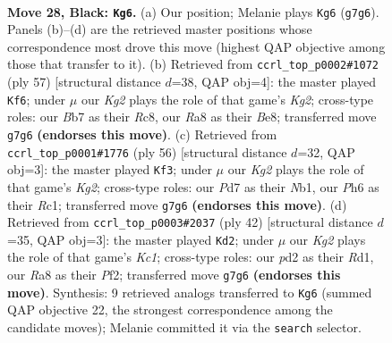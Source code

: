 \documentclass[11pt]{article}
\begin{document}
\clearpage

\begin{figure}[p]\centering
\begin{subfigure}{0.46\textwidth}\centering
\resizebox{\linewidth}{!}{%
\newchessgame
\chessboard[
  setfen={r7/pbpp2k1/1p3n1p/5p2/2P2P2/NP2K3/P2PB2P/R7 b - - 2 28},
  showmover=false,
  pgfstyle=straightmove, color=movearrow, markmove={g7-g6}
]}
\caption{}
\end{subfigure}\hfill
\begin{subfigure}{0.46\textwidth}\centering
\resizebox{\linewidth}{!}{%
\newchessgame
\chessboard[
  setfen={2r1b3/1p3pkp/p3p3/6p1/2P1P3/1P1R3P/P4PP1/5BK1 b - - 0 29},
  showmover=false,
  pgfstyle=straightmove, color=movearrow, markmove={g7-f6}
]}
\caption{}
\end{subfigure}
\\[4pt]
\begin{subfigure}{0.46\textwidth}\centering
\resizebox{\linewidth}{!}{%
\newchessgame
\chessboard[
  setfen={r7/1p3pk1/n3pbpp/3p4/3P4/BP2P1PP/5PK1/1NR5 w - - 2 29},
  showmover=false,
  pgfstyle=straightmove, color=movearrow, markmove={g2-f3}
]}
\caption{}
\end{subfigure}\hfill
\begin{subfigure}{0.46\textwidth}\centering
\resizebox{\linewidth}{!}{%
\newchessgame
\chessboard[
  setfen={r7/1p2kp2/2pb1p1p/4pP2/p7/2PB4/PP3PPP/2KR4 w - - 0 22},
  showmover=false,
  pgfstyle=straightmove, color=movearrow, markmove={c1-d2}
]}
\caption{}
\end{subfigure}
\caption{\textbf{Move 28, Black: \texttt{Kg6}.} (a) Our position; Melanie plays \texttt{Kg6} (\texttt{g7g6}). Panels (b)--(d) are the retrieved master positions whose correspondence most drove this move (highest QAP objective among those that transfer to it). (b) Retrieved from \texttt{ccrl\_top\_p0002\#1072} (ply 57) [structural distance $d$=38, QAP obj=4]: the master played \texttt{Kf6}; under $\mu$ our \emph{Kg2} plays the role of that game's \emph{Kg2}; cross-type roles: our \emph{B}b7 as their \emph{R}c8, our \emph{R}a8 as their \emph{B}e8; transferred move \texttt{g7g6} \textbf{(endorses this move)}. (c) Retrieved from \texttt{ccrl\_top\_p0001\#1776} (ply 56) [structural distance $d$=32, QAP obj=3]: the master played \texttt{Kf3}; under $\mu$ our \emph{Kg2} plays the role of that game's \emph{Kg2}; cross-type roles: our \emph{P}d7 as their \emph{N}b1, our \emph{P}h6 as their \emph{R}c1; transferred move \texttt{g7g6} \textbf{(endorses this move)}. (d) Retrieved from \texttt{ccrl\_top\_p0003\#2037} (ply 42) [structural distance $d$=35, QAP obj=3]: the master played \texttt{Kd2}; under $\mu$ our \emph{Kg2} plays the role of that game's \emph{Kc1}; cross-type roles: our \emph{p}d2 as their \emph{R}d1, our \emph{R}a8 as their \emph{P}f2; transferred move \texttt{g7g6} \textbf{(endorses this move)}. Synthesis: 9 retrieved analogs transferred to \texttt{Kg6} (summed QAP objective 22, the strongest correspondence among the candidate moves); Melanie committed it via the \texttt{search} selector.}
\label{fig:thought-m55}
\end{figure}
\end{document}
